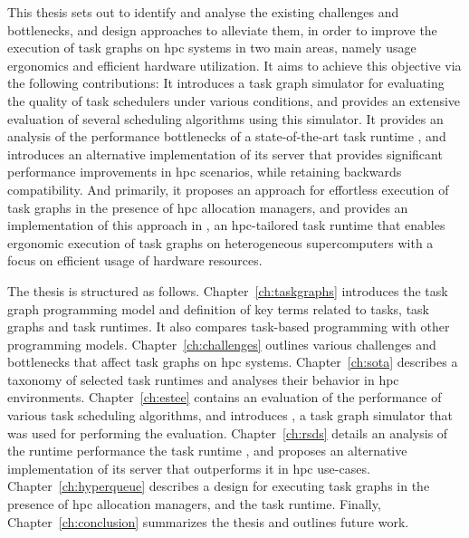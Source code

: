 This thesis sets out to identify and analyse the existing challenges and bottlenecks, and design
approaches to alleviate them, in order to improve the execution of task graphs on
\gls{hpc} systems in two main areas, namely usage ergonomics and efficient
hardware utilization. It aims to achieve this objective via the following contributions: It
introduces a task graph simulator for evaluating the quality of task schedulers under
various conditions, and provides an extensive evaluation of several scheduling algorithms using
this simulator. It provides an analysis of the performance bottlenecks of a state-of-the-art task
runtime \dask{}, and introduces an alternative implementation of its server that
provides significant performance improvements in \gls{hpc} scenarios, while retaining backwards
compatibility. And primarily, it proposes an approach for effortless execution of task graphs in the
presence of \gls{hpc} allocation managers, and provides an implementation of this approach in
\hyperqueue{}, an \gls{hpc}-tailored task runtime that enables ergonomic execution of task graphs on
heterogeneous supercomputers with a focus on efficient usage of hardware resources.


The thesis is structured as follows. Chapter~\ref{ch:taskgraphs} introduces the task graph
programming model and definition of key terms related to tasks, task graphs and task runtimes. It
also compares task-based programming with other programming models.
Chapter~\ref{ch:challenges} outlines various challenges and bottlenecks that affect task graphs
on \gls{hpc} systems. Chapter~\ref{ch:sota} describes a taxonomy of selected
task runtimes and analyses their behavior in \gls{hpc} environments.
Chapter~\ref{ch:estee} contains an evaluation of the performance of various task scheduling
algorithms, and introduces \estee{}, a task graph simulator that was used for
performing the evaluation. Chapter~\ref{ch:rsds} details an analysis of the runtime
performance the task runtime \dask{}, and proposes an alternative implementation of
its server that outperforms it in \gls{hpc} use-cases. Chapter~\ref{ch:hyperqueue}
describes a design for executing task graphs in the presence of \gls{hpc} allocation
managers, and the \hyperqueue{} task runtime. Finally, Chapter~\ref{ch:conclusion}
summarizes the thesis and outlines future work.
